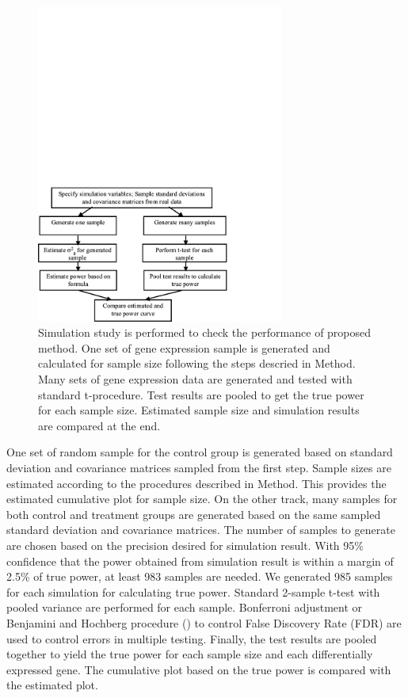 \documentclass{bioinfo}
\begin{document}
\begin{figure}[h]
  \centerline{\includegraphics*[width=3.2in]{SimuFC.pdf}}
  \caption[Flow Chart for Simulation Study]
  {Simulation study is performed to check the performance of proposed method.
    One set of gene expression sample is generated and calculated for sample size following the steps descried in Method. Many sets of gene expression data are generated and
    tested with standard t-procedure. Test results are pooled to get the true power for
    each sample size. Estimated sample size and simulation results are compared at the end.}
  \label{fig:SimuFC}
\end{figure}

One set of random sample for the control group is generated based on standard deviation and covariance matrices sampled from
the first step. Sample sizes are estimated according to the procedures described in Method. This provides the estimated
cumulative plot for sample size. On the other track, many samples for both control and treatment groups are generated based on
the same sampled standard deviation and covariance matrices. The number of samples to generate are chosen based on the
precision desired for simulation result. With 95\% confidence that the power obtained from simulation result is within a margin
of 2.5\% of true power, at least 983 samples are needed. We generated 985 samples for each simulation for calculating true
power. Standard 2-sample t-test with pooled variance are performed for each sample. Bonferroni adjustment or Benjamini and
Hochberg procedure (\citealp{Benjamini95}) to control False Discovery Rate (FDR) are used to control errors in multiple
testing. Finally, the test results are pooled together to yield the true power for each sample size and each differentially
expressed gene. The cumulative plot based on the true power is compared with the estimated plot.
\end{document}
